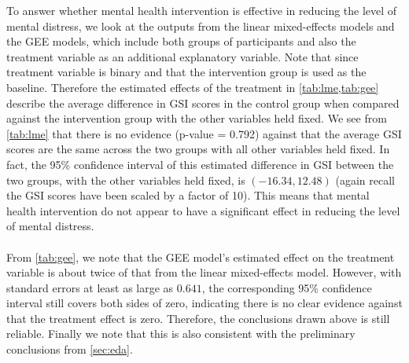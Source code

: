 \noindent\noindent To answer whether mental health intervention is effective in reducing the level of mental distress, we look at the outputs from the linear mixed-effects models and the GEE models, which include both groups of participants and also the treatment variable as an additional explanatory variable. Note that since treatment variable is binary and that the intervention group is used as the baseline. Therefore the estimated effects of the treatment in \cref{tab:lme,tab:gee} describe the average difference in GSI scores in the control group when compared against the intervention group with the other variables held fixed. We see from \cref{tab:lme} that there is no evidence (p-value = 0.792) against that the average GSI scores are the same across the two groups with all other variables held fixed. In fact, the 95\% confidence interval of this estimated difference in GSI between the two groups, with the other variables held fixed, is $(-16.34, 12.48)$ (again recall the GSI scores have been scaled by a factor of 10). This means that mental health intervention do not appear to have a significant effect in reducing the level of mental distress.\\\\
From \cref{tab:gee}, we note that the GEE model's estimated effect on the treatment variable is about twice of that from the linear mixed-effects model. However, with standard errors at least as large as $0.641$, the corresponding 95\% confidence interval still covers both sides of zero, indicating there is no clear evidence against that the treatment effect is zero. Therefore, the conclusions drawn above is still reliable. Finally we note that this is also consistent with the preliminary conclusions from \cref{sec:eda}.
